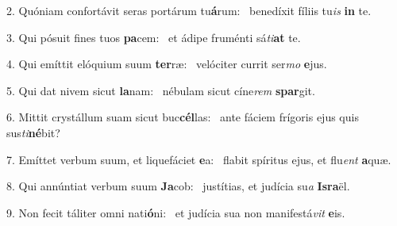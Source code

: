 2. Quóniam confortávit seras portárum tu\textbf{á}rum: \ast\  benedíxit fíliis tu\textit{is} \textbf{in} te.\

3. Qui pósuit fines tuos \textbf{pa}cem: \ast\  et ádipe fruménti sá\textit{ti}\textbf{at} te.\

4. Qui emíttit elóquium suum \textbf{ter}ræ: \ast\  velóciter currit ser\textit{mo} \textbf{e}jus.\

5. Qui dat nivem sicut \textbf{la}nam: \ast\  nébulam sicut cíne\textit{rem} \textbf{spar}git.\

6. Mittit crystállum suam sicut buc\textbf{cél}las: \ast\  ante fáciem frígoris ejus quis sus\textit{ti}\textbf{né}bit?\

7. Emíttet verbum suum, et liquefáciet \textbf{e}a: \ast\  flabit spíritus ejus, et flu\textit{ent} \textbf{a}quæ.\

8. Qui annúntiat verbum suum \textbf{Ja}cob: \ast\  justítias, et judícia su\textit{a} \textbf{Is}\textbf{ra}ël.\

9. Non fecit táliter omni nati\textbf{ó}ni: \ast\  et judícia sua non manifestá\textit{vit} \textbf{e}is.\

